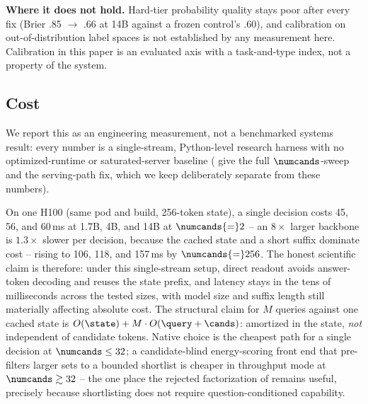 \textbf{Where it does not hold.} Hard-tier probability quality stays poor after every fix (Brier .85
$\to$ .66 at 14B against a frozen control's .60), and calibration on out-of-distribution label spaces is
not established by any measurement here. Calibration in this paper is an evaluated axis with a
task-and-type index, not a property of the system.

\subsection{Cost}
\label{sec:train:latency}

We report this as an engineering measurement, not a benchmarked systems result: every number is a
single-stream, Python-level research harness with no optimized-runtime or saturated-server baseline
( give the full $\numcands$-sweep and the serving-path fix, which we
keep deliberately separate from these numbers).

On one H100 (same pod and build, 256-token state), a single decision costs 45, 56, and 60\,ms at 1.7B,
4B, and 14B at $\numcands{=}2$ -- an $8\times$ larger backbone is $1.3\times$ slower per decision,
because the cached state and a short suffix dominate cost -- rising to 106, 118, and 157\,ms by
$\numcands{=}256$. The honest scientific claim is therefore: under this single-stream setup, direct
readout avoids answer-token decoding and reuses the state prefix, and latency stays in the tens of
milliseconds across the tested sizes, with model size and suffix length still materially affecting
absolute cost. The structural claim for $M$ queries against one cached state is
$O(\state) + M\cdot O(\query + \cands)$: amortized in the state, \emph{not} independent of candidate
tokens. Native choice is the cheapest path for a single decision at $\numcands \le 32$; a
candidate-blind energy-scoring front end that pre-filters larger sets to a bounded shortlist is cheaper
in throughput mode at $\numcands \gtrsim 32$ -- the one place the rejected factorization of
 remains useful, precisely because shortlisting does not require
question-conditioned capability.
